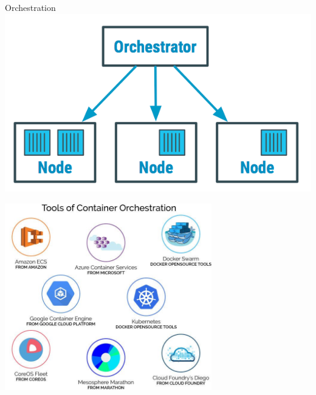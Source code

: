 \begin{frame}{Orchestration}
    \includegraphics{img/orchestrator.png}
\end{frame}

\begin{frame}[noframenumbering]
    \includegraphics[width=9cm]{img/orchs.jpg}
\end{frame}

